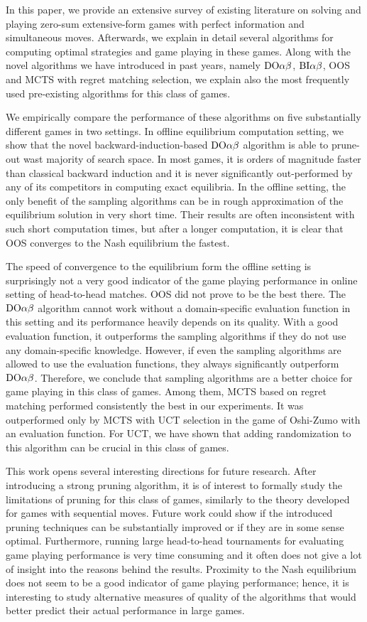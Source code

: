 
In this paper, we provide an extensive survey of existing literature on solving and playing zero-sum extensive-form games with perfect information and simultaneous moves. Afterwards, we explain in detail several algorithms for computing optimal strategies and game playing in these games. Along with the novel algorithms we have introduced in past years, namely $\textrm{DO}\alpha\beta$, $\textrm{BI}\alpha\beta$, OOS and MCTS with regret matching selection, we explain also the most frequently used pre-existing algorithms for this class of games.

We empirically compare the performance of these algorithms on five substantially different games in two settings. In offline equilibrium computation setting, we show that the novel backward-induction-based $\textrm{DO}\alpha\beta$ algorithm is able to prune-out wast majority of search space. In most games, it is orders of magnitude faster than classical backward induction and it is never significantly out-performed by any of its competitors in computing exact equilibria. In the offline setting, the only benefit of the sampling algorithms can be in rough approximation of the equilibrium solution in very short time. Their results are often inconsistent with such short computation times, but after a longer computation, it is clear that OOS converges to the Nash equilibrium the fastest.

The speed of convergence to the equilibrium form the offline setting is surprisingly not a very good indicator of the game playing performance in online setting of head-to-head matches. OOS did not prove to be the best there. The $\textrm{DO}\alpha\beta$ algorithm cannot work without a domain-specific evaluation function in this setting and its performance heavily depends on its quality. With a good evaluation function, it outperforms the sampling algorithms if they do not use any domain-specific knowledge. However, if even the sampling algorithms are allowed to use the evaluation functions, they always significantly outperform $\textrm{DO}\alpha\beta$. Therefore, we conclude that sampling algorithms are a better choice for game playing in this class of games. Among them, MCTS based on regret matching performed consistently the best in our experiments. It was outperformed only by MCTS with UCT selection in the game of Oshi-Zumo with an evaluation function. For UCT, we have shown that adding randomization to this algorithm can be crucial in this class of games.

This work opens several interesting directions for future research. After introducing a strong pruning algorithm, it is of interest to formally study the limitations of pruning  for this class of games, similarly to the theory developed for games with sequential moves. Future work could show if the introduced pruning techniques can be substantially improved or if they are in some sense optimal.
Furthermore, running large head-to-head tournaments for evaluating game playing performance is very time consuming and it often does not give a lot of insight into the reasons behind the results. Proximity to the Nash equilibrium does not seem to be a good indicator of game playing performance; hence, it is interesting to study alternative measures of quality of the algorithms that would better predict their actual performance in large games. \\


